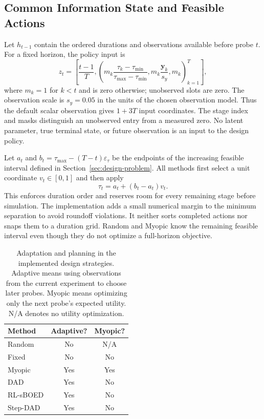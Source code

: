 \documentclass[journal]{IEEEtran}
\begin{document}
\subsection{Common Information State and Feasible Actions}
Let $h_{t-1}$ contain the ordered durations and observations available before
probe $t$. For a fixed horizon, the policy input is
\begin{equation}
z_t=\left[\frac{t-1}{T},
 \left(m_k\frac{\tau_k-\tau_{\min}}{\tau_{\max}-\tau_{\min}},
 m_k\frac{\mathbf y_k}{s_y},m_k\right)_{k=1}^{T}\right],
\label{eq:history-features}
\end{equation}
where $m_k=1$ for $k<t$ and is zero otherwise; unobserved slots are zero.
The observation scale is $s_y=0.05$ in the units of the chosen observation
model. Thus the default scalar observation gives $1+3T$ input coordinates.
The stage index and masks distinguish an unobserved entry from a measured
zero. No latent parameter, true terminal state, or future observation is an
input to the design policy.

Let $a_t$ and $b_t=\tau_{\max}-(T-t)\varepsilon_\tau$ be the endpoints of
the increasing feasible interval defined in Section~\ref{sec:design-problem}.
All methods first select a unit coordinate $v_t\in[0,1]$ and then apply
\begin{equation}
\tau_t=a_t+(b_t-a_t)v_t.
\label{eq:common-action-map}
\end{equation}
This enforces duration order and reserves room for every remaining stage
before simulation. The implementation adds a small numerical margin to the
minimum separation to avoid roundoff violations. It neither sorts completed
actions nor snaps them to a duration grid. Random and Myopic know the remaining
feasible interval even though they do not optimize a full-horizon objective.

\begin{table}[t]
\caption{Adaptation and planning in the implemented design strategies.
Adaptive means using observations from the current experiment to choose
later probes. Myopic means optimizing only the next probe's expected utility.
N/A denotes no utility optimization.}
\centering
\begin{tabular}{lcc}
\toprule
Method & Adaptive? & Myopic?\\
\midrule
Random & No & N/A\\
Fixed & No & No\\
Myopic & Yes & Yes\\
DAD & Yes & No\\
RL-sBOED & Yes & No\\
Step-DAD & Yes & No\\
\bottomrule
\end{tabular}
\label{tab:method-capabilities}
\end{table}
\end{document}
